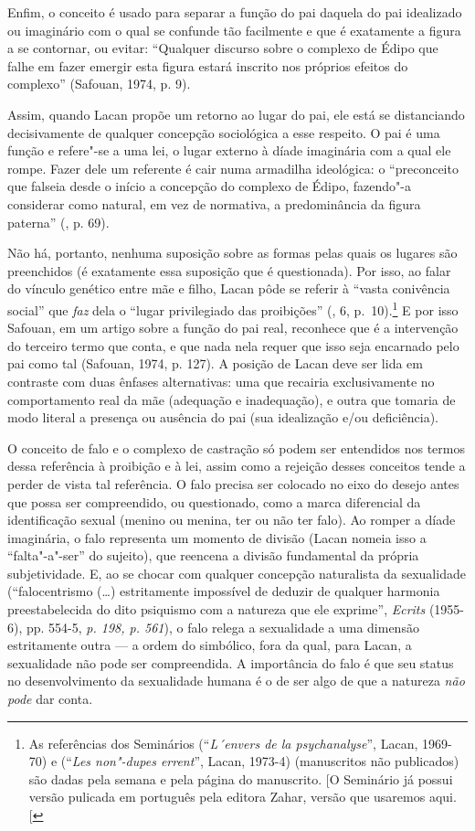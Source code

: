 Enfim, o conceito é usado para separar a função do pai daquela do pai
idealizado ou imaginário com o qual se confunde tão facilmente e que é
exatamente a figura a se contornar, ou evitar: ``Qualquer discurso sobre
o complexo de Édipo que falhe em fazer emergir esta figura estará
inscrito nos próprios efeitos do complexo'' (Safouan, 1974, p. 9).

Assim, quando Lacan propõe um retorno ao lugar do pai, ele está se
distanciando decisivamente de qualquer concepção sociológica a esse
respeito. O pai é uma função e refere"-se a uma lei, o lugar externo à
díade imaginária com a qual ele rompe. Fazer dele um referente é cair
numa armadilha ideológica: o ``preconceito que falseia desde o início a
concepção do complexo de Édipo, fazendo"-a considerar como natural, em
vez de normativa, a predominância da figura paterna'' (, p. 69).

Não há, portanto, nenhuma suposição sobre as formas pelas quais os
lugares são preenchidos (é exatamente essa suposição que é questionada).
Por isso, ao falar do vínculo genético entre mãe e filho, Lacan pôde se
referir à ``vasta conivência social'' que \emph{faz} dela o ``lugar
privilegiado das proibições'' (, 6, p.~10).\footnote{As referências
  dos Seminários  (``\emph{L´envers de la psychanalyse}'', Lacan,
  1969-70) e  (``\emph{Les non"-dupes errent}'', Lacan, 1973-4)
  (manuscritos não publicados) são dadas pela semana e pela página do
  manuscrito. {[}O Seminário  já possui versão pulicada em
  português pela editora Zahar, versão que usaremos aqui. {[}\versal{N.~T.}{]}} E por
isso Safouan, em um artigo sobre a função do pai real, reconhece que é a
intervenção do terceiro termo que conta, e que nada nela requer que isso
seja encarnado pelo pai como tal (Safouan, 1974, p. 127). A posição de
Lacan deve ser lida em contraste com duas ênfases alternativas: uma que
recairia exclusivamente no comportamento real da mãe (adequação e
inadequação), e outra que tomaria de modo literal a presença ou ausência
do pai (sua idealização e/ou deficiência).

O conceito de falo e o complexo de castração só podem ser entendidos nos
termos dessa referência à proibição e à lei, assim como a rejeição
desses conceitos tende a perder de vista tal referência. O falo precisa
ser colocado no eixo do desejo antes que possa ser compreendido, ou
questionado, como a marca diferencial da identificação sexual (menino ou
menina, ter ou não ter falo). Ao romper a díade imaginária, o falo
representa um momento de divisão (Lacan nomeia isso a ``falta"-a"-ser'' do
sujeito), que reencena a divisão fundamental da própria subjetividade.
E, ao se chocar com qualquer concepção naturalista da sexualidade
(``falocentrismo (\ldots{}) estritamente impossível de deduzir de qualquer
harmonia preestabelecida do dito psiquismo com a natureza que ele
exprime'', \emph{Ecrits} (1955-6), pp. 554-5, \emph{p. 198, p. 561}), o
falo relega a sexualidade a uma dimensão estritamente outra --- a ordem
do simbólico, fora da qual, para Lacan, a sexualidade não pode ser
compreendida. A importância do falo é que seu status no desenvolvimento
da sexualidade humana é o de ser algo de que a natureza \emph{não pode}
dar conta.

